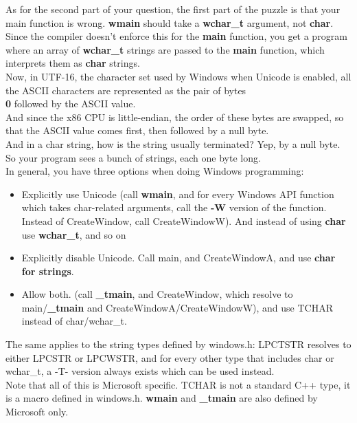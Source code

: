 	As for the second part of your question, the first part of the puzzle is that your main function is wrong. \textbf{wmain} should take a \textbf{wchar\_t} argument, not \textbf{char}. Since the compiler doesn't enforce this for the \textbf{main} function, you get a program where an array of \textbf{wchar\_t} strings are passed to the \textbf{main} function, which interprets them as \textbf{char} strings.\\
	
	Now, in UTF-16, the character set used by Windows when Unicode is enabled, all the ASCII characters are represented as the pair of bytes \textbf{\\0} followed by the ASCII value.\\
	
	And since the x86 CPU is little-endian, the order of these bytes are swapped, so that the ASCII value comes first, then followed by a null byte.\\
	
	And in a char string, how is the string usually terminated? Yep, by a null byte. So your program sees a bunch of strings, each one byte long.\\
	
	In general, you have three options when doing Windows programming:\\
	
	\begin{itemize}
		\item Explicitly use Unicode (call \textbf{wmain}, and for every Windows API function which takes char-related arguments, call the \textbf{-W} version of the function. Instead of CreateWindow, call CreateWindowW). And instead of using \textbf{char} use \textbf{wchar\_t}, and so on
		\item Explicitly disable Unicode. Call main, and CreateWindowA, and use \textbf{char for strings}.
		\item Allow both. (call \textbf{\_tmain}, and CreateWindow, which resolve to main/\textbf{\_tmain} and CreateWindowA/CreateWindowW), and use TCHAR instead of char/wchar\_t.
	\end{itemize}
	
	The same applies to the string types defined by windows.h: LPCTSTR resolves to either LPCSTR or LPCWSTR, and for every other type that includes char or wchar\_t, a -T- version always exists which can be used instead.\\
	
	Note that all of this is Microsoft specific. TCHAR is not a standard C++ type, it is a macro defined in windows.h. \textbf{wmain} and \textbf{\_tmain} are also defined by Microsoft only.\\
	
